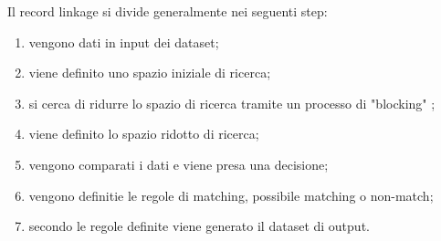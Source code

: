 \documentclass[a4paper,12pt]{article}
\begin{document}
\noindent Il record linkage si divide generalmente nei seguenti step:
\begin{enumerate}
\item vengono dati in input dei dataset;
\item viene definito uno spazio iniziale di ricerca;
\item si cerca di ridurre lo spazio di ricerca tramite un processo di "blocking" ;
\item viene definito lo spazio ridotto di ricerca;
\item vengono comparati i dati e viene presa una decisione;
\item vengono definitie le regole di matching, possibile matching o non-match;
\item secondo le regole definite viene generato il dataset di output.
\end{enumerate}
\end{document}
